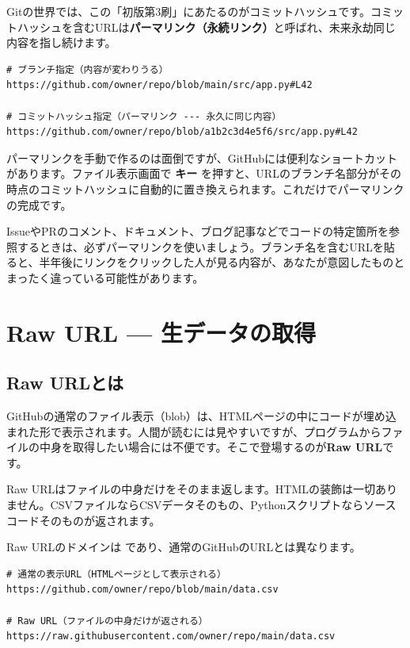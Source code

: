 Gitの世界では、この「初版第3刷」にあたるのがコミットハッシュです。コミットハッシュを含むURLは\textbf{パーマリンク（永続リンク）}と呼ばれ、未来永劫同じ内容を指し続けます。

\begin{lstlisting}[language={}]
# ブランチ指定（内容が変わりうる）
https://github.com/owner/repo/blob/main/src/app.py#L42

# コミットハッシュ指定（パーマリンク --- 永久に同じ内容）
https://github.com/owner/repo/blob/a1b2c3d4e5f6/src/app.py#L42
\end{lstlisting}

パーマリンクを手動で作るのは面倒ですが、GitHubには便利なショートカットがあります。ファイル表示画面で \textbf{キー} を押すと、URLのブランチ名部分がその時点のコミットハッシュに自動的に置き換えられます。これだけでパーマリンクの完成です。

IssueやPRのコメント、ドキュメント、ブログ記事などでコードの特定箇所を参照するときは、必ずパーマリンクを使いましょう。ブランチ名を含むURLを貼ると、半年後にリンクをクリックした人が見る内容が、あなたが意図したものとまったく違っている可能性があります。

\section{Raw URL --- 生データの取得}

\subsection{Raw URLとは}

GitHubの通常のファイル表示（blob）は、HTMLページの中にコードが埋め込まれた形で表示されます。人間が読むには見やすいですが、プログラムからファイルの中身を取得したい場合には不便です。そこで登場するのが\textbf{Raw URL}です。

Raw URLはファイルの中身だけをそのまま返します。HTMLの装飾は一切ありません。CSVファイルならCSVデータそのもの、Pythonスクリプトならソースコードそのものが返されます。

Raw URLのドメインは  であり、通常のGitHubのURLとは異なります。

\begin{lstlisting}[language={}]
# 通常の表示URL（HTMLページとして表示される）
https://github.com/owner/repo/blob/main/data.csv

# Raw URL（ファイルの中身だけが返される）
https://raw.githubusercontent.com/owner/repo/main/data.csv
\end{lstlisting}

